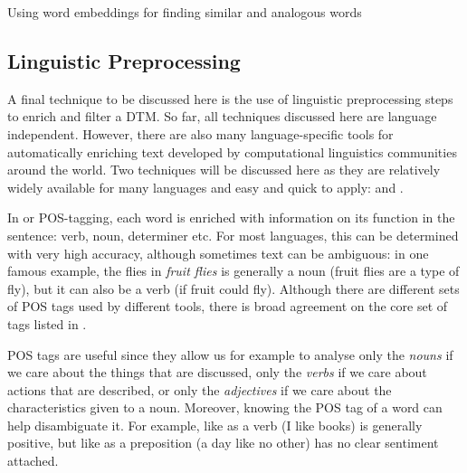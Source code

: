 \begin{ccsexample}
\caption{Using word embeddings for finding similar and analogous words}\label{ex:embedding}
\end{ccsexample}





\subsection{Linguistic Preprocessing}
\label{sec:nlp}

A final technique to be discussed here is the use of linguistic preprocessing steps to enrich and filter a DTM.
So far, all techniques discussed here are language independent.
However, there are also many language-specific tools for automatically enriching text developed by computational linguistics communities around the world.
Two techniques will be discussed here as they are relatively widely available for many languages and easy and quick to apply:  and .

In  or POS-tagging, each word is enriched with information on its function in the sentence: verb, noun, determiner etc.
For most languages, this can be determined with very high accuracy, although sometimes text can be ambiguous:
in one famous example, the flies in \emph{fruit flies} is generally a noun (fruit flies are a type of fly), but it can also be a verb (if fruit could fly). 
Although there are different sets of POS tags used by different tools, there is broad agreement on the core set of tags listed in .


POS tags are useful since they allow us for example to analyse only the \textit{nouns} if we care about the things that are discussed, only the \textit{verbs} if we care about actions that are described, or only the \textit{adjectives} if we care about the characteristics given to a noun.
Moreover, knowing the POS tag of a word can help disambiguate it.
For example, like as a verb (I like books) is generally positive, but like as a preposition (a day like no other) has no clear sentiment attached.

